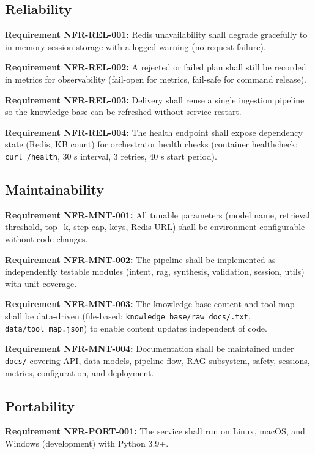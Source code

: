 \documentclass[10pt,journal,onecolumn]{IEEEtran}
\newcommand{\reqid}[1]{\textbf{#1}}
\begin{document}
\subsection{Reliability}

\reqid{Requirement NFR-REL-001:} Redis unavailability shall degrade gracefully to in-memory session storage with a logged warning (no request failure).

\reqid{Requirement NFR-REL-002:} A rejected or failed plan shall still be recorded in metrics for observability (fail-open for metrics, fail-safe for command release).

\reqid{Requirement NFR-REL-003:} Delivery shall reuse a single ingestion pipeline so the knowledge base can be refreshed without service restart.

\reqid{Requirement NFR-REL-004:} The health endpoint shall expose dependency state (Redis, KB count) for orchestrator health checks (container healthcheck: \texttt{curl /health}, 30 s interval, 3 retries, 40 s start period).

\subsection{Maintainability}

\reqid{Requirement NFR-MNT-001:} All tunable parameters (model name, retrieval threshold, top\_k, step cap, keys, Redis URL) shall be environment-configurable without code changes.

\reqid{Requirement NFR-MNT-002:} The pipeline shall be implemented as independently testable modules (intent, rag, synthesis, validation, session, utils) with unit coverage.

\reqid{Requirement NFR-MNT-003:} The knowledge base content and tool map shall be data-driven (file-based: \texttt{knowledge\_\allowbreak base/\allowbreak raw\_\allowbreak docs/\allowbreak *.\allowbreak txt}, \texttt{data/tool\_map.json}) to enable content updates independent of code.

\reqid{Requirement NFR-MNT-004:} Documentation shall be maintained under \texttt{docs/} covering API, data models, pipeline flow, RAG subsystem, safety, sessions, metrics, configuration, and deployment.

\subsection{Portability}

\reqid{Requirement NFR-PORT-001:} The service shall run on Linux, macOS, and Windows (development) with Python 3.9+.
\end{document}
